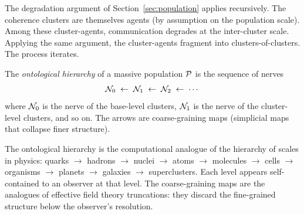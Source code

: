 The degradation argument of Section~\ref{sec:population} applies
recursively.
The coherence clusters are themselves agents (by assumption on the
population scale).
Among these cluster-agents, communication degrades at the
inter-cluster scale.
Applying the same argument, the cluster-agents fragment into
clusters-of-clusters.
The process iterates.

\begin{definition}
The \emph{ontological hierarchy} of a massive population $\mathcal{P}$
is the sequence of nerves
\[
  \mathcal{N}_0 \;\leftarrow\; \mathcal{N}_1 \;\leftarrow\; \mathcal{N}_2
  \;\leftarrow\; \cdots
\]
where $\mathcal{N}_0$ is the nerve of the base-level clusters,
$\mathcal{N}_1$ is the nerve of the cluster-level clusters, and so on.
The arrows are coarse-graining maps (simplicial maps that collapse
finer structure).
\end{definition}

\begin{remark}
The ontological hierarchy is the computational analogue of the
hierarchy of scales in physics:
quarks $\to$ hadrons $\to$ nuclei $\to$ atoms $\to$ molecules
$\to$ cells $\to$ organisms $\to$ planets $\to$ galaxies
$\to$ superclusters.
Each level appears self-contained to an observer at that level.
The coarse-graining maps are the analogues of effective field theory
truncations: they discard the fine-grained structure below the
observer's resolution.
\end{remark}

